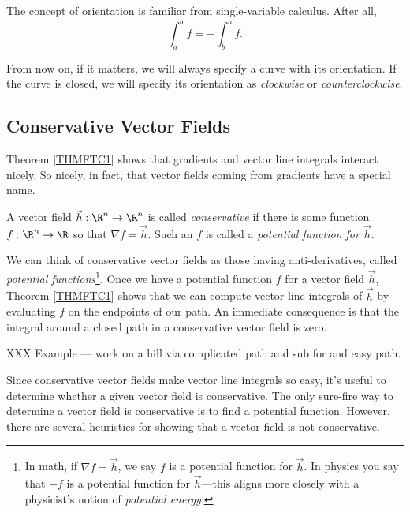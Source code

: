 The concept of orientation is familiar from single-variable calculus.
After all,
\[
	\int_a^b f=-\int_b^a f.
\]

From now on, if it matters, we will always specify a curve with
its orientation.  If the curve is closed, we will specify its orientation
as \emph{clockwise} or \emph{counterclockwise}.

\subsection{Conservative Vector Fields}

Theorem \ref{THMFTC1} shows that gradients and vector line integrals
interact nicely.  So nicely, in fact, that vector fields coming 
from gradients have a special name.

\begin{definition}
	A vector field $\vec h:\R^n\to\R^n$ is called \emph{conservative}
	if there is some function $f:\R^n\to\R$ so that $\nabla f=\vec h$.
	Such an $f$ is called a \emph{potential function for $\vec h$}.
\end{definition}

We can think of conservative vector fields
as those having anti-derivatives,
called \emph{potential functions}\footnote{
In math, if $\nabla f=\vec h$, we say $f$ is a potential function for $\vec h$.
In physics you say that $-f$ is a potential function for $\vec h$---this aligns
more closely with a physicist's notion of \emph{potential energy}.}.  Once
we have a potential function $f$ for a vector field $\vec h$, 
Theorem \ref{THMFTC1} shows that we can compute vector line integrals
of $\vec h$ by evaluating $f$ on the endpoints of our path.  An immediate consequence
is that the integral around a closed path in a conservative vector field is
zero.

\begin{example}
	XXX Example --- work on a hill via complicated path and sub for
	and easy path.
\end{example}

Since conservative vector fields make vector line integrals so easy, it's useful
to determine whether a given vector field is conservative.  The only sure-fire
way to determine a vector field is conservative is to find a potential function.
However, there are several heuristics for showing that a vector field is not
conservative.

